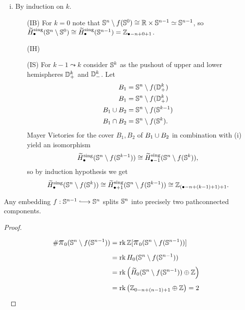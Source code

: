 \begin{sketch}
\begin{enumerate}[(i)]
{\begin{enumerate}
{					}
				\end{enumerate}
			}
			\item{
				By induction on $k$.
				\begin{enumerate}
					\item[(IB)]{
						For $k=0$ note that $\S^n \setminus f(\S^0) \isom \R \times \S^{n-1} \simeq \S^{n-1}$, so $\widetilde{H}_\bullet^\text{sing}(\S^n \setminus \S^0) \isom \widetilde{H}_\bullet^\text{sing}(\S^{n-1}) = \Z_{\bullet-n+0+1}$.
					}
					\item[(IH)]{
					}
					\item[(IS)]{
						For $k-1 \leadsto k$ consider $\S^k$ as the pushout of upper and lower hemispheres $\D^k_{+}$ and $\D^k_{-}$. Let
						\begin{align*}
							B_1 &= \S^n \setminus f(\D^k_{+})\\
							B_1 &= \S^n \setminus f(\D^k_{+})\\
							B_1 \union B_2 &= \S^n \setminus f(\S^{k-1})\\
							B_1 \intersection B_2 &= \S^n \setminus f(\S^k).
						\end{align*}
						Mayer Vietories for the cover $B_1,B_2$ of $B_1 \union B_2$ in combination with (i) yield an isomorphism
						\begin{equation*}
							\widetilde{H}_\bullet^\text{sing}(\S^n \setminus f(\S^{k-1})) \isom \widetilde{H}_{\bullet-1}^\text{sing}(\S^n \setminus f(\S^{k})),
						\end{equation*}
						so by induction hypothesis we get
						\begin{equation*}
							\widetilde{H}_{\bullet}^\text{sing}(\S^n \setminus f(\S^{k})) \isom \widetilde{H}_{\bullet+1}^\text{sing}(\S^n \setminus f(\S^{k-1})) \isom \Z_{(\bullet-n+(k-1)+1)+1}.
						\end{equation*}
					}
				\end{enumerate}
			}\vspace{-2.5em}
		\end{enumerate}
	\end{sketch}

	\begin{corollary}
		Any embedding $f:\S^{n-1} \longrightincl \S^n$ splits $\S^n$ into precisely two pathconnected components.
	\end{corollary}
	\begin{proof}
		~\vspace{-2.55em}
		\begin{align*}
			\# \largepi_0(\S^n \setminus f(\S^{n-1})) &= \rk \Z[\largepi_0(\S^n \setminus f(\S^{n-1}))]\\
			&= \rk H_0(\S^n \setminus f(\S^{n-1}))\\
			&= \rk \left (\widetilde{H}_0(\S^n \setminus f(\S^{n-1})) \oplus \Z\right)\\
			&= \rk \left (\Z_{0-n+(n-1)+1} \oplus \Z\right) = 2
		\end{align*}
		~\vspace{-2em}
	\end{proof}


